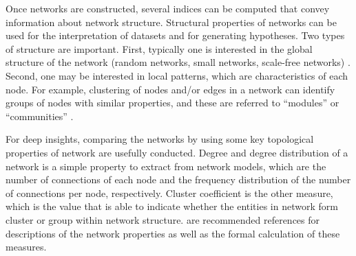Once networks are constructed, several indices can be computed that convey information about network structure. Structural properties of networks can be used for the interpretation of datasets and for generating hypotheses. Two types of structure are important. First, typically one is interested in the global structure of the network (random networks, small networks, scale-free networks) . Second, one may be interested in local patterns, which are characteristics of each node. For example, clustering of nodes and/or edges in a network can identify groups of nodes with similar properties, and these are referred to ``modules'' or ``communities''  .

For deep insights, comparing the networks by using some key topological properties of network are usefully conducted. Degree and degree distribution of a network is a simple property to extract from network models, which are the number of connections of each node and the frequency distribution of the number of connections per node, respectively. Cluster coefficient is the other measure, which is the value that is able to indicate whether the entities in network form cluster or group within network structure.  are recommended references for descriptions of the network properties as well as the formal calculation of these measures.





